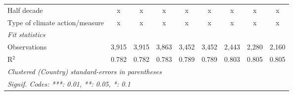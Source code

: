 \begin{tabular}{lcccccccc}
   Half decade                                                                        & x             & x             & x             & x             & x             & x             & x             & x\\  
   Type of climate action/measure                                                     & x             & x             & x             & x             & x             & x             & x             & x\\  
   \midrule \emph{Fit statistics}\\
   Observations                                                                       & 3,915         & 3,915         & 3,863         & 3,452         & 3,452         & 2,443         & 2,280         & 2,160\\  
   R$^2$                                                                              & 0.782         & 0.782         & 0.783         & 0.789         & 0.789         & 0.803         & 0.805         & 0.805\\  
   \midrule
   \multicolumn{9}{l}{\emph{Clustered (Country) standard-errors in parentheses}}\\
   \multicolumn{9}{l}{\emph{Signif. Codes: ***: 0.01, **: 0.05, *: 0.1}}\\
\end{tabular}
\par\endgroup


